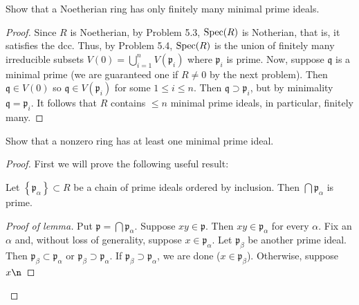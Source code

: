 \newpage
\begin{problem}
Show that a Noetherian ring has only finitely many minimal prime
ideals.
\end{problem}
\begin{proof}
Since $R$ is Noetherian, by Problem 5.3, $\operatorname{Spec}(R)$ is Notherian, that
is, it satisfies the dcc. Thus, by Problem 5.4, $\operatorname{Spec}(R)$ is the
union of finitely many irreducible subsets
$V(0)=\bigcup_{i=1}^nV(\mathfrak{p}_i)$ where $\mathfrak{p}_i$ is
prime. Now, suppose $\mathfrak{q}$ is a minimal prime (we are
guaranteed one if $R\neq 0$ by the next problem). Then
$\mathfrak{q}\in V(0)$ so $\mathfrak{q}\in V(\mathfrak{p}_i)$ for some
$1\leq i\leq n$. Then $\mathfrak{q}\supset\mathfrak{p}_i$, but by
minimality $\mathfrak{q}=\mathfrak{p}_i$. It follows that $R$ contains
$\leq n$ minimal prime ideals, in particular, finitely many.
\end{proof}
\newpage
\begin{problem}
Show that a nonzero ring has at least one minimal prime ideal.
\end{problem}
\begin{proof}
First we will prove the following useful result:
\begin{lemma*}
Let $\left\{\mathfrak{p}_\alpha\right\}\subset R$ be a chain of prime
ideals ordered by inclusion. Then $\bigcap\mathfrak{p}_\alpha$ is prime.
\end{lemma*}
\begin{proof}[Proof of lemma]
\renewcommand\qedsymbol{$\clubsuit$}
Put $\mathfrak{p}=\bigcap\mathfrak{p}_\alpha$. Suppose
$xy\in\mathfrak{p}$. Then $xy\in\mathfrak{p}_\alpha$ for every
$\alpha$. Fix an $\alpha$ and, without loss of generality, suppose
$x\in\mathfrak{p}_\alpha$. Let $\mathfrak{p}_\beta$ be another prime
ideal. Then $\mathfrak{p}_\beta\subset\mathfrak{p}_\alpha$ or
$\mathfrak{p}_\beta\supset\mathfrak{p}_\alpha$. If
$\mathfrak{p}_\beta\supset\mathfrak{p}_\alpha$, we are done
($x\in\mathfrak{p}_\beta$). Otherwise, suppose $x\n$
\end{proof}
\end{proof}

